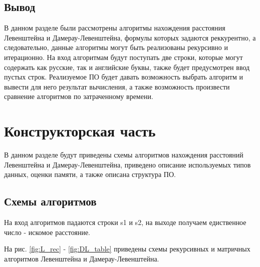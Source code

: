 \documentclass[a4paper,14pt, unknownkeysallowed]{extreport}
\begin{document}
\section{Вывод}
В данном разделе были рассмотрены алгоритмы нахождения расстояния Левенштейна и Дамерау-Левенштейна,
формулы которых задаются реккурентно, а следовательно, данные алгоритмы могут быть реализованы рекурсивно и итерационно. На вход алгоритмам будут поступать две строки, которые могут содержать как русские, так и английские буквы, также будет предусмотрен ввод пустых строк. Реализуемое ПО будет давать возможность выбрать алгоритм и вывести для него результат вычисления, а также возможность произвести сравнение алгоритмов по затраченному времени.





\chapter{Конструкторская часть}
В данном разделе будут приведены схемы алгоритмов нахождения расстояний Левенштейна и Дамерау-Левенштейна, приведено описание используемых типов данных, оценки памяти, а также описана структура ПО.

\section{Схемы алгоритмов}

На вход алгоритмов падаются строки s1 и s2, на выходе получаем едиственное число - искомое расстояние.

На рис. \ref{fig:L_rec} - \ref{fig:DL_table} приведены схемы рекурсивных и матричных алгоритмов Левенштейна и Дамерау-Левенштейна.

\clearpage
\end{document}
